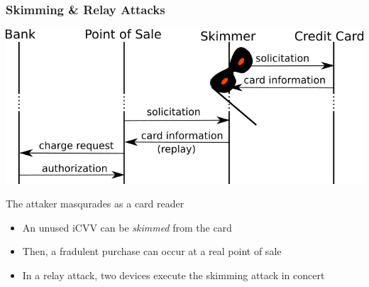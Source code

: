 \documentclass[unknownkeysallowed]{beamer}
\begin{document}
\begin{frame}
\frametitle{Skimming \& Relay Attacks}\centering
  \includegraphics[width=.7\linewidth,height=\textheight,keepaspectratio]{../TomPaper/figures/CCskimMask.png}\newline
    \begin{minipage}{.8\textwidth}
      \vspace{3mm}
      \begin{block}{The attaker masqurades as a card reader}
        \begin{itemize}
          \item{An unused iCVV can be \textit{skimmed} from the card}
          \item{Then, a fradulent purchase can occur at a real point of sale}
          \pause
          \item{In a relay attack, two devices execute the skimming attack in concert}
        \end{itemize}
      \end{block}
    \end{minipage}
\end{frame}
\end{document}

